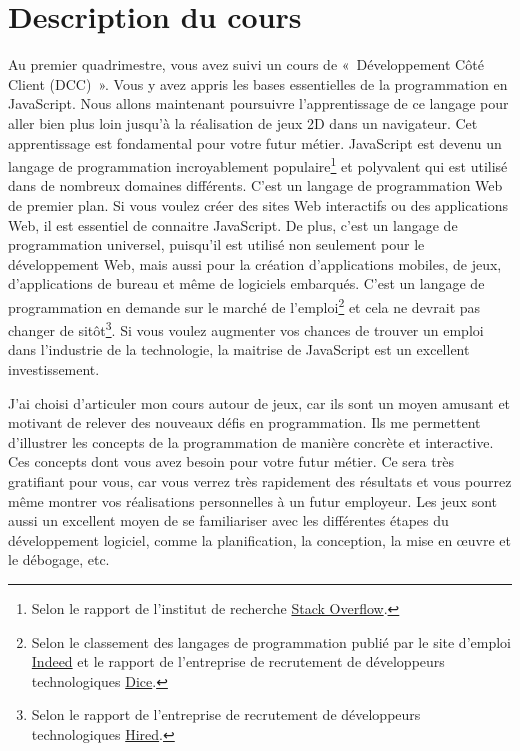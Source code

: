 \section{Description du cours}

Au premier quadrimestre, vous avez suivi un cours de «~Développement Côté Client (DCC)~». Vous y avez appris les bases essentielles de la programmation en JavaScript. Nous allons maintenant poursuivre l'apprentissage de ce langage pour aller bien plus loin jusqu'à la réalisation de jeux 2D dans un navigateur. Cet apprentissage est fondamental pour votre futur métier. JavaScript est devenu un langage de programmation incroyablement populaire\footnote{Selon le rapport de l'institut de recherche \href{https://insights.stackoverflow.com/survey}{Stack Overflow}.} et polyvalent qui est utilisé dans de nombreux domaines différents. C'est un langage de programmation Web de premier plan. Si vous voulez créer des sites Web interactifs ou des applications Web, il est essentiel de connaitre JavaScript. De plus, c'est un langage de programmation universel, puisqu'il est utilisé non seulement pour le développement Web, mais aussi pour la création d'applications mobiles, de jeux, d'applications de bureau et même de logiciels embarqués. C'est un langage de programmation en demande sur le marché de l'emploi\footnote{Selon le classement des langages de programmation publié par le site d'emploi \href{https://www.indeed.com/jobtrends/javascript.html}{Indeed} et le rapport de l'entreprise de recrutement de développeurs technologiques \href{https://www.dice.com}{Dice}.} et cela ne devrait pas changer de sitôt\footnote{Selon le rapport de l'entreprise de recrutement de développeurs technologiques \href{https://hired.com/}{Hired}.}. Si vous voulez augmenter vos chances de trouver un emploi dans l'industrie de la technologie, la maitrise de JavaScript est un excellent investissement.

J'ai choisi d'articuler mon cours autour de jeux, car ils sont un moyen amusant et motivant de relever des nouveaux défis en programmation. Ils me permettent d'illustrer les concepts de la programmation de manière concrète et interactive. Ces concepts dont vous avez besoin pour votre futur métier. Ce sera très gratifiant pour vous, car vous verrez très rapidement des résultats et vous pourrez même montrer vos réalisations personnelles à un futur employeur. Les jeux sont aussi un excellent moyen de se familiariser avec les différentes étapes du développement logiciel, comme la planification, la conception, la mise en œuvre et le débogage, etc.

